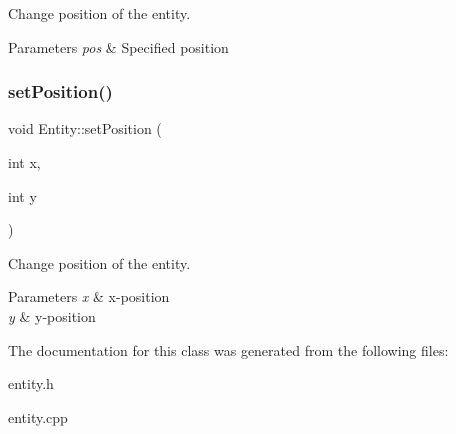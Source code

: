 Change position of the entity. 


\begin{DoxyParams}{Parameters}
{\em pos} & Specified position \\
\hline
\end{DoxyParams}
\mbox{\label{classEntity_a8871ade33babf42d554f498154f35e26}} 
\subsubsection{\texorpdfstring{set\+Position()}{setPosition()}\hspace{0.1cm}{\footnotesize\ttfamily [2/2]}}
{\footnotesize\ttfamily void Entity\+::set\+Position (\begin{DoxyParamCaption}\item[{int}]{x,  }\item[{int}]{y }\end{DoxyParamCaption})}



Change position of the entity. 


\begin{DoxyParams}{Parameters}
{\em x} & x-\/position \\
\hline
{\em y} & y-\/position \\
\hline
\end{DoxyParams}


The documentation for this class was generated from the following files\+:\begin{DoxyCompactItemize}
\item 
entity.\+h\item 
entity.\+cpp\end{DoxyCompactItemize}
